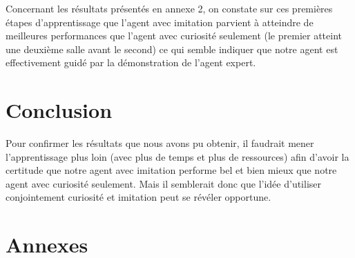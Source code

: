 \documentclass[a4paper,12pt]{report}
\begin{document}
Concernant les résultats présentés en annexe 2, on constate sur ces premières étapes d'apprentissage que l'agent avec imitation parvient à atteindre de meilleures performances que l'agent avec curiosité seulement (le premier atteint une deuxième salle avant le second) ce qui semble indiquer que notre agent est effectivement guidé par la démonstration de l'agent expert.

\section*{Conclusion}
Pour confirmer les résultats que nous avons pu obtenir, il faudrait mener l'apprentissage plus loin (avec plus de temps et plus de ressources) afin d'avoir la certitude que notre agent avec imitation performe bel et bien mieux que notre agent avec curiosité seulement. Mais il semblerait donc que l'idée d'utiliser conjointement curiosité et imitation peut se révéler opportune.

\newpage
\section{Annexes}
\end{document}
